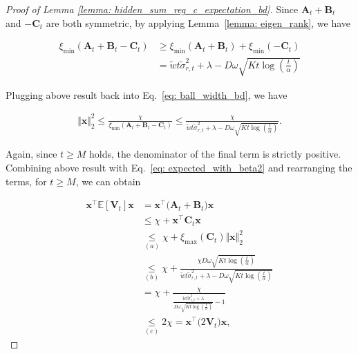 \begin{proof}[Proof of Lemma \ref{lemma: hidden_sum_reg_c_expectation_bd}]
Since $\boldsymbol{A}_t+\boldsymbol{B}_t$ and $-\boldsymbol{C}_t$ are both symmetric, by applying Lemma~\ref{lemma: eigen_rank}, we have 

\[
\begin{aligned}
\xi_{\min} \left( \boldsymbol{A}_t + \boldsymbol{B}_t - \boldsymbol{C}_t \right) 
& \geq
\xi_{\min} \left( \boldsymbol{A}_t + \boldsymbol{B}_t \right) 
+
\xi_{\min} \left( -\boldsymbol{C}_t \right) \\
& = 
\tilde{w} t \tilde{\sigma}^2_{r,t} + \lambda - D \omega \sqrt{ K t \log \left( \frac{t}{\alpha} \right)}
\end{aligned}
\]

Plugging above result back into Eq.~\ref{eq: ball_width_bd}, we have

\begin{equation}
\begin{aligned}
\label{eq: ball_width_bd2}
\Vert \boldsymbol{x} \Vert_2^2 
\leq
\frac{\chi}{\xi_{\min} \left( \boldsymbol{A}_t + \boldsymbol{B}_t - \boldsymbol{C}_t \right)}
\leq
\frac{\chi}{\tilde{w} t \tilde{\sigma}^2_{r,t} + \lambda - D \omega \sqrt{ K t \log \left( \frac{t}{\alpha} \right)}}.
\end{aligned}
\end{equation}

Again, since $t \geq M$ holds, the denominator of the final term is strictly positive.
Combining above result with Eq.~\ref{eq: expected_with_beta2} and rearranging the terms, for $t \geq M$, we can obtain

\begin{equation}
\begin{aligned}
\boldsymbol{x}^{\top} 
\mathbb{E} [\boldsymbol{V}_t]
\boldsymbol{x}
& =
\boldsymbol{x} ^{\top} 
\big ( \boldsymbol{A}_t + \boldsymbol{B}_t \big )
\boldsymbol{x} \\
& \leq 
\chi + \boldsymbol{x}^{\top} 
\boldsymbol{C}_t
\boldsymbol{x} \\
& \underset{(a)}{\leq}
\chi + \xi_{\max} \left(\boldsymbol{C}_t \right) \Vert \boldsymbol{x} \Vert_2^2 \\
& \underset{(b)}{\leq}
\chi + \frac{\chi D \omega \sqrt{ Kt \log \left( \frac{t}{\alpha} \right)}}{ \tilde{w} t \tilde{\sigma}^2_{r,t} + \lambda - D \omega \sqrt{ Kt \log \left( \frac{t}{\alpha} \right)}} \\
& = 
\chi + \frac{\chi}{\frac{ \tilde{w} t \tilde{\sigma}^2_{r,t} + \lambda}{ D \omega \sqrt{ Kt \log \left( \frac{t}{\alpha} \right)}} - 1} \\
& \underset{(c)}{\leq}
2 \chi 
= 
\boldsymbol{x}^{\top} \big( 2\boldsymbol{V}_t \big) \boldsymbol{x},
\end{aligned}
\end{equation}


\end{proof}
